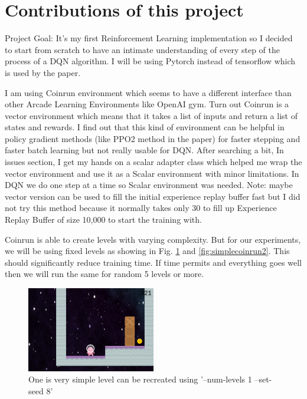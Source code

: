 \documentclass[10pt,twocolumn,letterpaper]{article}
\begin{document}
\section{Contributions of this project}

Project Goal: It's my first Reinforcement Learning implementation so I decided to start from scratch to have an intimate understanding of every step of the process of a DQN algorithm. I will be using Pytorch instead of tensorflow which is used by the paper.

I am using Coinrun environment which seems to have a different interface than other Arcade Learning Environments like OpenAI gym. Turn out Coinrun is a vector environment which means that it takes a list of inputs and return a list of states and rewards. I find out that this kind of environment can be helpful in policy gradient methods (like PPO2 method in the paper) for faster stepping and faster batch learning but not really usable for DQN. After searching a bit, In issues section, I get my hands on a scalar adapter class which helped me wrap the vector environment and use it as a Scalar environment with minor limitations. In DQN we do one step at a time so Scalar environment was needed. Note: maybe vector version can be used to fill the initial experience replay buffer fast but I did not try this method because it normally takes only 30 to fill up Experience Replay Buffer of size 10,000  to start the training with.

Coinrun is able to create levels with varying complexity. But for our experiments, we will be using fixed levels as showing in Fig. \ref{fig:simplecoinrun} and \ref{fig:simplecoinrun2}. This should significantly reduce training time. If time permits and everything goes well then we will run the same for random 5 levels or more. 

\begin{figure}[h]
   \centering
    \includegraphics[width=0.50\textwidth]{images/simple_seed8.png}
    \caption{One is very simple level can be recreated using '--num-levels 1 --set-seed 8' }
    \label{fig:simplecoinrun}
\end{figure}
\end{document}
